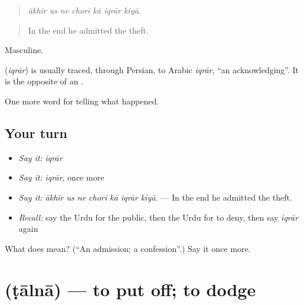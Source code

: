 \begin{quote}
      
\end{quote}

\begin{quote}
\emph{ākhir us ne chorī kā iqrār kiyā.}
\end{quote}

\begin{quote}
In the end he admitted the theft.
\end{quote}

Masculine.

\begin{cousinweb}
\textbf{} (\emph{iqrār}) is usually traced, through Persian, to Arabic \emph{iqrār}, \textquotedblleft{}an acknowledging\textquotedblright{}. It is the opposite of an \textbf{}.
\end{cousinweb}

\begin{grammarlens}[title={What you've built}]
One more word for telling what happened.
\end{grammarlens}

\subsection*{Your turn}
\begin{itemize}
\raggedright
  \item \emph{Say it:} \emph{iqrār}
  \item \emph{Say it:} \emph{iqrār}, once more
  \item \emph{Say it:} \emph{ākhir us ne chorī kā iqrār kiyā.} — In the end he admitted the theft.
  \item \emph{Recall:} say the Urdu for the public, then the Urdu for to deny, then say \emph{iqrār} again
\end{itemize}

\begin{tcolorbox}[breakable,colback=teal!4,colframe=teal!35!black,title={Before you move on}]
What does  mean? (\textquotedblleft{}An admission; a confession\textquotedblright{}.) Say it once more.
\end{tcolorbox}
\section[\texorpdfstring{\ur{ٹالنا} (ṭālnā)}{ٹالنا (ṭālnā)}]{ (ṭālnā) — to put off; to dodge}

